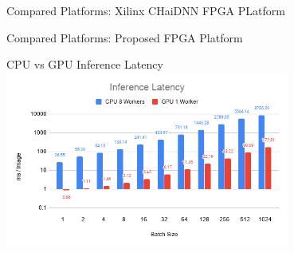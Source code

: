 \begin{frame}{Compared Platforms: Xilinx CHaiDNN FPGA PLatform}
\end{frame}

\begin{frame}{Compared Platforms: Proposed FPGA Platform}
\end{frame}

\begin{frame}{CPU vs GPU Inference Latency}
	\centering
	\includegraphics[width=0.7\textwidth]{../Images/Results/CPU-GPU-Inference-Latency.png}\\
\end{frame}

